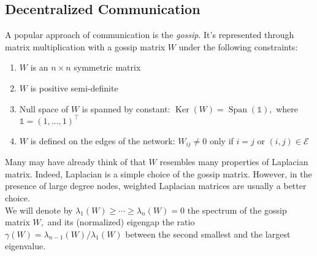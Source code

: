 \documentclass[12pt]{article}
\begin{document}
\subsection{Decentralized Communication}
A popular approach of communication is the \textit{gossip}. It's represented through matrix multiplication with a gossip matrix $W$ under the following constraints:
\begin{enumerate}
    \item $W$ is an $n \times n$ symmetric matrix
    \item $W$ is positive semi-definite
    \item Null space of $W$ is spanned by constant: $\operatorname { Ker } ( W ) = \operatorname { Span } ( \mathbb { 1 } ) ,$ where $\mathbb { 1 } = ( 1 , \ldots , 1 ) ^ { \top }$
    \item $W$ is defined on the edges of the network: $W _ { i j } \neq 0$ only if $i = j$ or $( i , j ) \in \mathcal { E }$
\end{enumerate}
Many may have already think of that $W$ resembles many properties of Laplacian matrix. Indeed, Laplacian is a simple choice of the gossip matrix. 
However, in the presence of large degree nodes, weighted Laplacian matrices are usually a better choice.\\
\newline
We will denote by $\lambda _ { 1 } ( W ) \geq \cdots \geq \lambda _ { n } ( W ) = 0$ the spectrum of the gossip matrix $W ,$ and its
(normalized) eigengap the ratio $\gamma ( W ) = \lambda _ { n - 1 } ( W ) / \lambda _ { 1 } ( W )$ between the second smallest and the largest eigenvalue.
\end{document}
